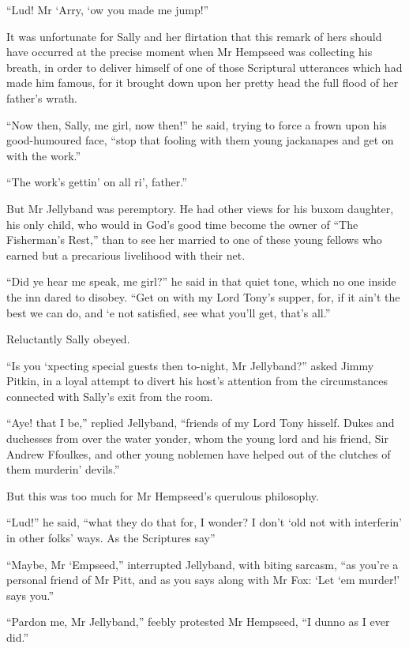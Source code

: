\enquote{Lud! Mr `Arry, `ow you made me jump!}

It was unfortunate for Sally and her flirtation that this remark of hers should have occurred at the precise moment when Mr Hempseed was collecting his breath, in order to deliver himself of one of those Scriptural utterances which had made him famous, for it brought down upon her pretty head the full flood of her father's wrath.

\enquote{Now then, Sally, me girl, now then!} he said, trying to force a frown upon his good-humoured face, \enquote{stop that fooling with them young jackanapes and get on with the work.}

\enquote{The work's gettin’ on all ri’, father.}

But Mr Jellyband was peremptory. He had other views for his buxom daughter, his only child, who would in God's good time become the owner of \enquote{The Fisherman's Rest,} than to see her married to one of these young fellows who earned but a precarious livelihood with their net.

\enquote{Did ye hear me speak, me girl?} he said in that quiet tone, which no one inside the inn dared to disobey. \enquote{Get on with my Lord Tony's supper, for, if it ain't the best we can do, and `e not satisfied, see what you'll get, that's all.}

Reluctantly Sally obeyed.

\enquote{Is you `xpecting special guests then to-night, Mr Jellyband?} asked Jimmy Pitkin, in a loyal attempt to divert his host's attention from the circumstances connected with Sally's exit from the room.

\enquote{Aye! that I be,} replied Jellyband, \enquote{friends of my Lord Tony hisself. Dukes and duchesses from over the water yonder, whom the young lord and his friend, Sir Andrew Ffoulkes, and other young noblemen have helped out of the clutches of them murderin’ devils.}

But this was too much for Mr Hempseed's querulous philosophy.

\enquote{Lud!} he said, \enquote{what they do that for, I wonder? I don't `old not with interferin’ in other folks’ ways. As the Scriptures say\longdash}

\enquote{Maybe, Mr `Empseed,} interrupted Jellyband, with biting sarcasm, \enquote{as you're a personal friend of Mr Pitt, and as you says along with Mr Fox: \enquote{Let `em murder!} says you.}

\enquote{Pardon me, Mr Jellyband,} feebly protested Mr Hempseed, \enquote{I dunno as I ever did.}

